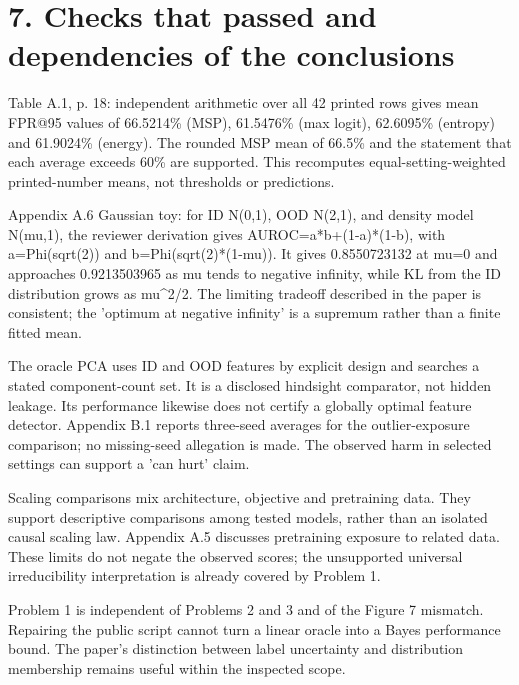 \documentclass[10pt]{article}
\begin{document}
\section*{7. Checks that passed and dependencies of the conclusions}
Table A.1, p. 18: independent arithmetic over all 42 printed rows gives mean FPR@95 values of 66.5214\% (MSP), 61.5476\% (max logit), 62.6095\% (entropy) and 61.9024\% (energy). The rounded MSP mean of 66.5\% and the statement that each average exceeds 60\% are supported. This recomputes equal-setting-weighted printed-number means, not thresholds or predictions.\par
Appendix A.6 Gaussian toy: for ID N(0,1), OOD N(2,1), and density model N(mu,1), the reviewer derivation gives AUROC=a*b+(1-a)*(1-b), with a=Phi(sqrt(2)) and b=Phi(sqrt(2)*(1-mu)). It gives 0.8550723132 at mu=0 and approaches 0.9213503965 as mu tends to negative infinity, while KL from the ID distribution grows as mu\textasciicircum{}2/2. The limiting tradeoff described in the paper is consistent; the ’optimum at negative infinity’ is a supremum rather than a finite fitted mean.\par
The oracle PCA uses ID and OOD features by explicit design and searches a stated component-count set. It is a disclosed hindsight comparator, not hidden leakage. Its performance likewise does not certify a globally optimal feature detector. Appendix B.1 reports three-seed averages for the outlier-exposure comparison; no missing-seed allegation is made. The observed harm in selected settings can support a ’can hurt’ claim.\par
Scaling comparisons mix architecture, objective and pretraining data. They support descriptive comparisons among tested models, rather than an isolated causal scaling law. Appendix A.5 discusses pretraining exposure to related data. These limits do not negate the observed scores; the unsupported universal irreducibility interpretation is already covered by Problem 1.\par
Problem 1 is independent of Problems 2 and 3 and of the Figure 7 mismatch. Repairing the public script cannot turn a linear oracle into a Bayes performance bound. The paper’s distinction between label uncertainty and distribution membership remains useful within the inspected scope.\par
\end{document}
